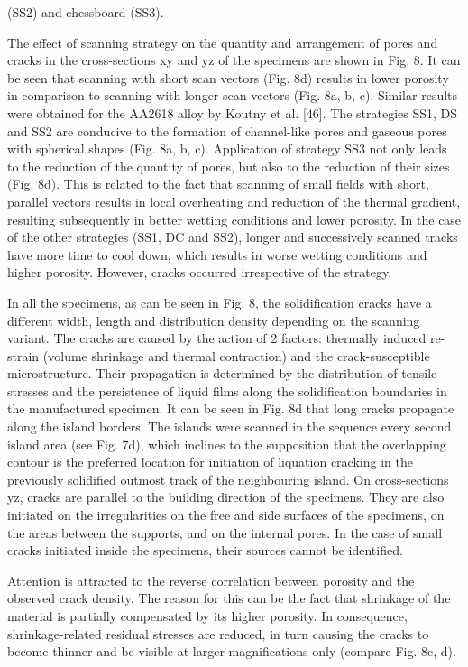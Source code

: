 \documentclass[10pt]{article}
\begin{document}
(SS2) and chessboard (SS3).

The effect of scanning strategy on the quantity and arrangement of pores and cracks in the cross-sections xy and yz of the specimens are shown in Fig. 8. It can be seen that scanning with short scan vectors (Fig. 8d) results in lower porosity in comparison to scanning with longer scan vectors (Fig. 8a, b, c). Similar results were obtained for the AA2618 alloy by Koutny et al. [46]. The strategies SS1, DS and SS2 are conducive to the formation of channel-like pores and gaseous pores with spherical shapes (Fig. 8a, b, c). Application of strategy SS3 not only leads to the reduction of the quantity of pores, but also to the reduction of their sizes (Fig. 8d). This is related to the fact that scanning of small fields with short, parallel vectors results in local overheating and reduction of the thermal gradient, resulting subsequently in better wetting conditions and lower porosity. In the case of the other strategies (SS1, DC and SS2), longer and successively scanned tracks have more time to cool down, which results in worse wetting conditions and higher porosity. However, cracks occurred irrespective of the strategy.

In all the specimens, as can be seen in Fig. 8, the solidification cracks have a different width, length and distribution density depending on the scanning variant. The cracks are caused by the action of 2 factors: thermally induced re-strain (volume shrinkage and thermal contraction) and the crack-susceptible microstructure. Their propagation is determined by the distribution of tensile stresses and the persistence of liquid films along the solidification boundaries in the manufactured specimen. It can be seen in Fig. 8d that long cracks propagate along the island borders. The islands were scanned in the sequence every second island area (see Fig. 7d), which inclines to the supposition that the overlapping contour is the preferred location for initiation of liquation cracking in the previously solidified outmost track of the neighbouring island. On cross-sections yz, cracks are parallel to the building direction of the specimens. They are also initiated on the irregularities on the free and side surfaces of the specimens, on the areas between the supports, and on the internal pores. In the case of small cracks initiated inside the specimens, their sources cannot be identified.

Attention is attracted to the reverse correlation between porosity and the observed crack density. The reason for this can be the fact that shrinkage of the material is partially compensated by its higher porosity. In consequence, shrinkage-related residual stresses are reduced, in turn causing the cracks to become thinner and be visible at larger magnifications only (compare Fig. 8c, d).
\end{document}
